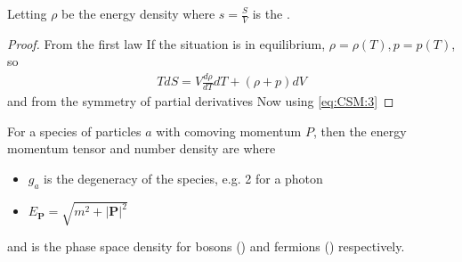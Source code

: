 \documentclass{article}
\begin{document}
\begin{prop}
Letting $\rho$ be the energy density
where $s=\frac{S}{V}$ is the .
\end{prop}
\begin{proof}
From the first law
If the situation is in equilibrium, $\rho=\rho(T), p=p(T)$, so 
\begin{align} \label{eq:CSM:3}
TdS = V \frac{d\rho}{dT} dT + (\rho + p) dV
\end{align}
and from the symmetry of partial derivatives 
Now using \ref{eq:CSM:3} 
\end{proof}

\begin{definition}
For a species of particles $a$ with comoving momentum $P$, then the energy momentum tensor and number density are 
where 
\begin{itemize}
    \item $g_a$ is the degeneracy of the species, e.g. 2 for a photon
    \item $E_{\bm{P}} = \sqrt{m^2 + |\bm{P}|^2}$
\end{itemize}
and 
is the phase space density for bosons () and fermions () respectively. 
\end{definition}
\end{document}
